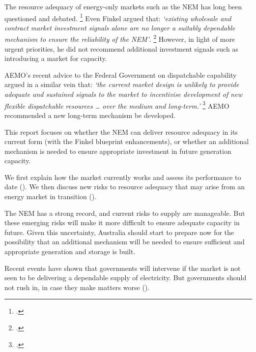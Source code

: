 \documentclass[FrontPage]{grattan}
\begin{document}
The resource adequacy of energy-only markets such as the NEM has long been questioned and debated.%
\footcites{deVries2003InstabilityOfEOM}{hogan2005energy}{Joskow2006CompetitiveElectricityMarkets}{Joskow2008CapacityPayments}{Simshauser2008CapacityPayments}{Simshauser2010ResourceAdequacy}{Cramton2013CapacityMarketFundamentals}{Riesz2013CapacityMarket}{Hirth2014EnergyOnlyVsCapacity}{NewberyGrubb2014SecurityOfSupply}{Oxford2016ElectricityMarketsBroken}
Even Finkel argued that: \emph{`existing wholesale and contract market investment signals alone are no longer a suitably dependable mechanism to ensure the reliability of the NEM'}.%
\footcite[][83]{Finkel2017ReviewFinal}
However, in light of more urgent priorities, he did not recommend additional investment signals such as introducing a market for capacity.

AEMO's recent advice to the Federal Government on dispatchable capability argued in a similar vein that: \emph{`the current market design is unlikely to provide adequate and sustained signals to the market to incentivise development of new flexible dispatchable resources \dots{} over the medium and long-term.'}%
\footcite{AEMO2017AdviceDispatchableCapacity}
AEMO recommended a new long-term mechanism be developed.

This report focuses on whether the NEM can deliver resource adequacy in its current form (with the Finkel blueprint enhancements), or whether an additional mechanism is needed to ensure appropriate investment in future generation capacity.

We first explain how the market currently works and assess its performance to date (). We then discuss new risks to resource adequacy that may arise from an energy market in transition ().

The NEM has a strong record, and current risks to supply are manageable. But these emerging risks will make it more difficult to ensure adequate capacity in future. Given this uncertainty, Australia should start to prepare now for the possibility that an additional mechanism will be needed to ensure sufficient and appropriate generation and storage is built.

Recent events have shown that governments will intervene if the market is not seen to be delivering a dependable supply of electricity. But governments should not rush in, in case they make matters worse ().
\end{document}
